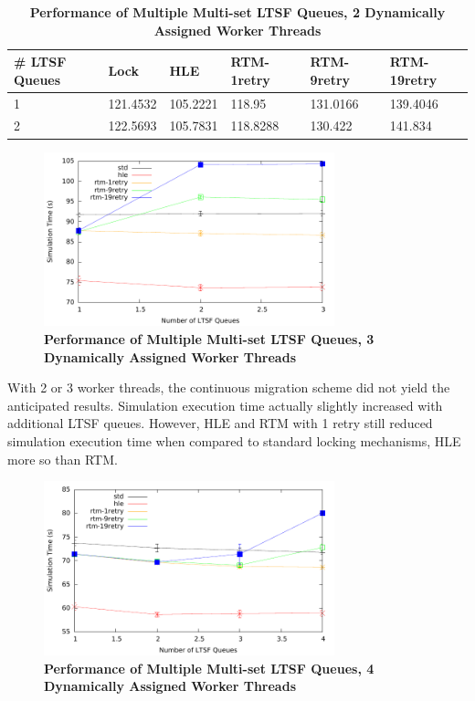 \documentclass[11pt]{book}
\begin{document}
\begin{table}
    \centering
    \begin{tabular}{l|p{2cm}|p{2cm}|p{2cm}|p{2cm}|p{2cm}}
        \textbf{\# LTSF Queues}&Lock &HLE &RTM-1retry &RTM-9retry &RTM-19retry \\
        \hline
        \midrule
            1 &121.4532  &105.2221 &118.95   &131.0166 &139.4046 \\ 
            2 &122.5693  &105.7831 &118.8288 &130.422  &141.834  \\
    \end{tabular}
    \caption{\textbf{Performance of Multiple Multi-set LTSF Queues, 2 Dynamically Assigned Worker Threads}}
    \label{tab:contThrMig_2threadsXschq}
\end{table}

\begin{figure}
    \centering
    \graphicspath{ {./figures/} }
    \includegraphics[width=0.75\textwidth,keepaspectratio]{hugeepidemicsim-CONTmig-timeVSschedQs-multiset-3thread}
    \caption{\textbf{Performance of Multiple Multi-set LTSF Queues, 3 Dynamically Assigned Worker Threads}}
    \label{fig:contThrMig_timeVSschq_3threads}
\end{figure}

With 2 or 3 worker threads, the continuous migration scheme did not yield the
anticipated results.  Simulation execution time actually slightly increased with
additional LTSF queues.  However, HLE and RTM with 1 retry still reduced
simulation execution time when compared to standard locking mechanisms, HLE more so
than RTM.

\begin{figure}
    \centering
    \graphicspath{ {./figures/} }
    \includegraphics[width=0.75\textwidth,keepaspectratio]{hugeepidemicsim-CONTmig-timeVSschedQs-multiset-4thread}
    \caption{\textbf{Performance of Multiple Multi-set LTSF Queues, 4 Dynamically Assigned Worker Threads}}
    \label{fig:contThrMig_timeVSschq_4threads}
\end{figure}
\end{document}
